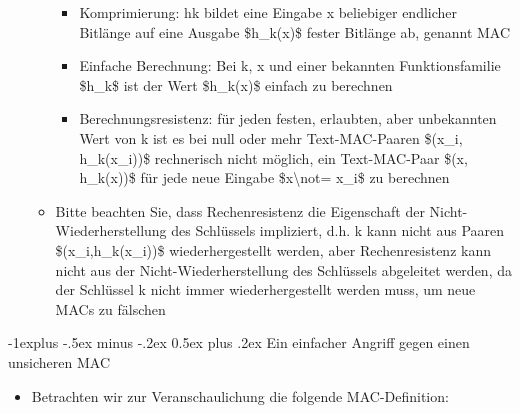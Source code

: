 \documentclass[a4paper]{article}
\makeatletter
\renewcommand{\subsection}{\@startsection{subsection}{2}{0mm}%
 {-1explus -.5ex minus -.2ex}%
 {0.5ex plus .2ex}%
 {\normalfont\normalsize\bfseries}}
\makeatother
\begin{document}
\begin{multicols}{3}
\begin{itemize}
\begin{itemize}
                        \begin{itemize}
                            \item
                                  Komprimierung: hk bildet eine Eingabe x beliebiger endlicher
                                  Bitlänge auf eine Ausgabe \$h\_k(x)\$ fester Bitlänge ab, genannt
                                  MAC
                            \item
                                  Einfache Berechnung: Bei k, x und einer bekannten Funktionsfamilie
                                  \$h\_k\$ ist der Wert \$h\_k(x)\$ einfach zu berechnen
                            \item
                                  Berechnungsresistenz: für jeden festen, erlaubten, aber
                                  unbekannten Wert von k ist es bei null oder mehr Text-MAC-Paaren
                                  \$(x\_i, h\_k(x\_i))\$ rechnerisch nicht möglich, ein
                                  Text-MAC-Paar \$(x, h\_k(x))\$ für jede neue Eingabe
                                  \$x\textbackslash not= x\_i\$ zu berechnen
                        \end{itemize}
                  \item
                        Bitte beachten Sie, dass Rechenresistenz die Eigenschaft der
                        Nicht-Wiederherstellung des Schlüssels impliziert, d.h. k kann nicht
                        aus Paaren \$(x\_i,h\_k(x\_i))\$ wiederhergestellt werden, aber
                        Rechenresistenz kann nicht aus der Nicht-Wiederherstellung des
                        Schlüssels abgeleitet werden, da der Schlüssel k nicht immer
                        wiederhergestellt werden muss, um neue MACs zu fälschen
              \end{itemize}
    \end{itemize}


    \subsection{Ein einfacher Angriff gegen einen unsicheren
        MAC}

    \begin{itemize}
        \item
              Betrachten wir zur Veranschaulichung die folgende MAC-Definition:


\end{itemize}
\end{multicols}
\end{document}
